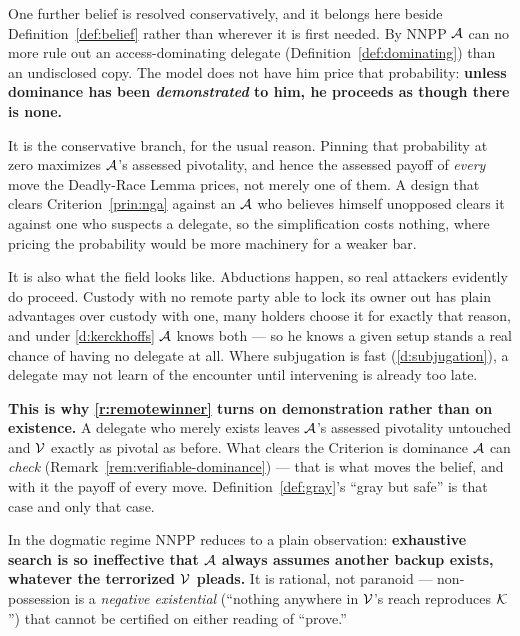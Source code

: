 \begin{remark}\label{rem:nodelegate}
One further belief is resolved conservatively, and it belongs here beside
Definition~\ref{def:belief} rather than wherever it is first needed. By NNPP
$\mathcal{A}$ can no more rule out an access-dominating delegate
(Definition~\ref{def:dominating}) than an undisclosed copy. The model does not
have him price that probability: \textbf{unless dominance has been
\emph{demonstrated} to him, he proceeds as though there is none.}

It is the conservative branch, for the usual reason. Pinning that probability at
zero maximizes $\mathcal{A}$'s assessed pivotality, and hence the assessed payoff
of \emph{every} move the Deadly-Race Lemma prices, not merely one of them. A
design that clears Criterion~\ref{prin:nga} against an $\mathcal{A}$ who believes
himself unopposed clears it against one who suspects a delegate, so the
simplification costs nothing, where pricing the probability would be more
machinery for a weaker bar.

It is also what the field looks like. Abductions happen, so real attackers
evidently do proceed. Custody with no remote party able to lock its owner out
has plain advantages over custody with one, many holders choose it for exactly
that reason, and under \ref{d:kerckhoffs} $\mathcal{A}$ knows both --- so he knows
a given setup stands a real chance of having no delegate at all. Where
subjugation is fast (\ref{d:subjugation}), a delegate may not learn of the
encounter until intervening is already too late.

\textbf{This is why \ref{r:remotewinner} turns on demonstration rather than on
existence.} A delegate who merely exists leaves $\mathcal{A}$'s assessed
pivotality untouched and $\mathcal{V}$ exactly as pivotal as before. What clears the
Criterion is dominance $\mathcal{A}$ can \emph{check}
(Remark~\ref{rem:verifiable-dominance}) --- that is what moves the belief, and
with it the payoff of every move. Definition~\ref{def:gray}'s ``gray but safe''
is that case and only that case.
\end{remark}

\noindent In the dogmatic regime NNPP reduces to a plain observation:
\textbf{exhaustive search is so ineffective that $\mathcal{A}$ always assumes
another backup exists, whatever the terrorized $\mathcal{V}$ pleads.} It is
rational, not paranoid --- non-possession is a
\emph{negative existential} (``nothing anywhere in $\mathcal{V}$'s reach reproduces
$\mathcal{K}$'') that cannot be certified on either reading of ``prove.''

